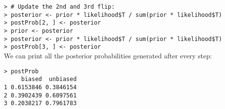 \documentclass{article}
\begin{document}
\noindent \verb|> # Update the 2nd and 3rd flip:|\\
\verb|> posterior <- prior * likelihood$T / sum(prior * likelihood$T)|\\
\verb|> postProb[2, ] <- posterior|\\
\verb|> prior <- posterior|\\
\verb|> posterior <- prior * likelihood$T / sum(prior * likelihood$T)|\\
\verb|> postProb[3, ] <- posterior|\\

We can print all the posterior probabilities generated after every step:
\begin{lstlisting}
> postProb
     biased  unbiased
1 0.6153846 0.3846154
2 0.3902439 0.6097561
3 0.2038217 0.7961783
\end{lstlisting}
\end{document}
